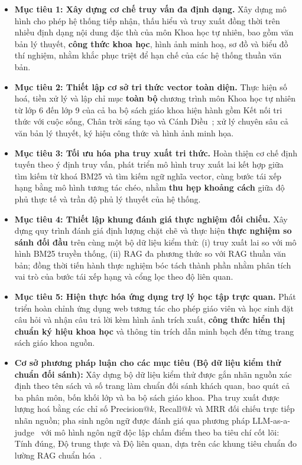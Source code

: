 \begin{itemize}
    \item \textbf{Mục tiêu 1: Xây dựng cơ chế truy vấn đa định dạng.} Xây dựng mô hình cho phép hệ thống tiếp nhận, thấu hiểu và truy xuất đồng thời trên nhiều định dạng nội dung đặc thù của môn Khoa học tự nhiên, bao gồm văn bản lý thuyết, \textbf{công thức khoa học}, hình ảnh minh hoạ, sơ đồ và biểu đồ thí nghiệm, nhằm khắc phục triệt để hạn chế của các hệ thống thuần văn bản.
    \item \textbf{Mục tiêu 2: Thiết lập cơ sở tri thức vector toàn diện.} Thực hiện số hoá, tiền xử lý và lập chỉ mục \textbf{toàn bộ} chương trình môn Khoa học tự nhiên từ lớp 6 đến lớp 9 của cả ba bộ sách giáo khoa hiện hành gồm Kết nối tri thức với cuộc sống, Chân trời sáng tạo và Cánh Diều~\cite{sgk_kntt6, sgk_kntt7, sgk_kntt8, sgk_kntt9, sgk_ctst6, sgk_ctst7, sgk_ctst8, sgk_ctst9, sgk_cd6, sgk_cd7, sgk_cd8, sgk_cd9}; xử lý chuyên sâu cả văn bản lý thuyết, ký hiệu công thức và hình ảnh minh họa.
    \item \textbf{Mục tiêu 3: Tối ưu hóa pha truy xuất tri thức.} Hoàn thiện cơ chế định tuyến theo ý định truy vấn, phát triển mô hình truy xuất lai kết hợp giữa tìm kiếm từ khoá BM25 và tìm kiếm ngữ nghĩa vector, cùng bước tái xếp hạng bằng mô hình tương tác chéo, nhằm \textbf{thu hẹp khoảng cách} giữa độ phủ thực tế và trần độ phủ lý thuyết của hệ thống.
    \item \textbf{Mục tiêu 4: Thiết lập khung đánh giá thực nghiệm đối chiếu.} Xây dựng quy trình đánh giá định lượng chặt chẽ và thực hiện \textbf{thực nghiệm so sánh đối đầu} trên cùng một bộ dữ liệu kiểm thử: (i) truy xuất lai so với mô hình BM25 truyền thống, (ii) RAG đa phương thức so với RAG thuần văn bản; đồng thời tiến hành thực nghiệm bóc tách thành phần nhằm phân tích vai trò của bước tái xếp hạng và cổng lọc theo độ liên quan.
    \item \textbf{Mục tiêu 5: Hiện thực hóa ứng dụng trợ lý học tập trực quan.} Phát triển hoàn chỉnh ứng dụng web tương tác cho phép giáo viên và học sinh đặt câu hỏi và nhận câu trả lời kèm hình ảnh trích xuất, \textbf{công thức hiển thị chuẩn ký hiệu khoa học} và thông tin trích dẫn minh bạch đến từng trang sách giáo khoa nguồn.
    \item \textbf{Cơ sở phương pháp luận cho các mục tiêu (Bộ dữ liệu kiểm thử chuẩn đối sánh):} Xây dựng bộ dữ liệu kiểm thử được gắn nhãn nguồn xác định theo tên sách và số trang làm chuẩn đối sánh khách quan, bao quát cả ba phân môn, bốn khối lớp và ba bộ sách giáo khoa. Pha truy xuất được lượng hoá bằng các chỉ số Precision@$k$, Recall@$k$ và MRR đối chiếu trực tiếp nhãn nguồn; pha sinh ngôn ngữ được đánh giá qua phương pháp LLM-as-a-judge~\cite{zheng2023llmjudge} với mô hình ngôn ngữ độc lập chấm điểm theo ba tiêu chí cốt lõi: Tính đúng, Độ trung thực và Độ liên quan, dựa trên các khung tiêu chuẩn đo lường RAG chuẩn hóa~\cite{es2024ragas, saadfalcon2023ares}.
\end{itemize}

